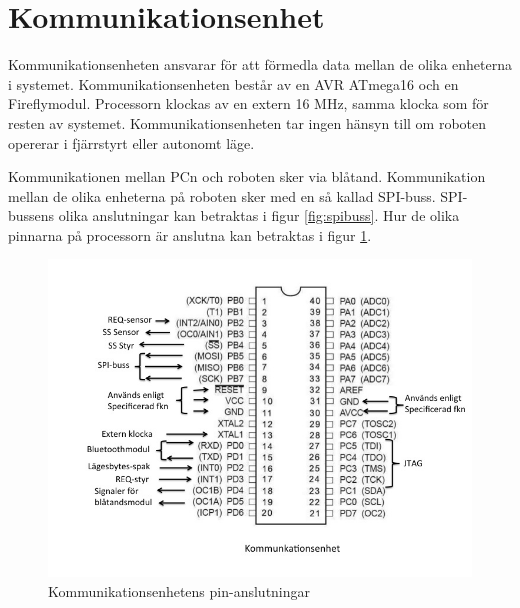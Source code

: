 %

\section{Kommunikationsenhet}

Kommunikationsenheten ansvarar för att förmedla data mellan de olika enheterna i systemet. Kommunikationsenheten består av en AVR ATmega16 och en Fireflymodul. Processorn klockas av en extern 16 MHz, samma klocka som för resten av systemet. Kommunikationsenheten tar ingen hänsyn till om roboten opererar i fjärrstyrt eller autonomt läge.

Kommunikationen mellan PCn och roboten sker via blåtand. Kommunikation mellan de olika enheterna på roboten sker med en så kallad SPI-buss. SPI-bussens olika anslutningar kan betraktas i figur \ref{fig:spibuss}. Hur de olika pinnarna på processorn är anslutna kan betraktas i figur \ref{fig:PINkomm}.

\begin{figure}[H]
  \centering
 \includegraphics[angle=0,scale=0.5]{bilder/PIN_komm.jpg}
  \caption{Kommunikationsenhetens pin-anslutningar}
  \label{fig:PINkomm}
\end{figure}

